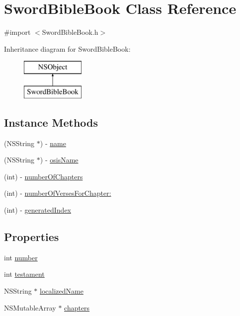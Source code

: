 \hypertarget{interface_sword_bible_book}{\section{Sword\-Bible\-Book Class Reference}
\label{interface_sword_bible_book}
}


{\ttfamily \#import $<$Sword\-Bible\-Book.\-h$>$}

Inheritance diagram for Sword\-Bible\-Book\-:\begin{figure}[H]
\begin{center}
\leavevmode
\includegraphics[height=2.000000cm]{interface_sword_bible_book}
\end{center}
\end{figure}
\subsection*{Instance Methods}
\begin{DoxyCompactItemize}
\item 
(N\-S\-String $\ast$) -\/ \hyperlink{interface_sword_bible_book_ac6691947ac2050dd45d083b4b998dada}{name}
\item 
(N\-S\-String $\ast$) -\/ \hyperlink{interface_sword_bible_book_a46996c5aaf602191a7a67dac407e023b}{osis\-Name}
\item 
(int) -\/ \hyperlink{interface_sword_bible_book_aac4a53d604f7b17a154e851538639254}{number\-Of\-Chapters}
\item 
(int) -\/ \hyperlink{interface_sword_bible_book_af8894ea2e0763646ed9d1cceee96a63f}{number\-Of\-Verses\-For\-Chapter\-:}
\item 
(int) -\/ \hyperlink{interface_sword_bible_book_a5228b654c226be16fbfd724c44f0c670}{generated\-Index}
\end{DoxyCompactItemize}
\subsection*{Properties}
\begin{DoxyCompactItemize}
\item 
int \hyperlink{interface_sword_bible_book_a7106e2abc437ad981830d14176d15f09}{number}
\item 
int \hyperlink{interface_sword_bible_book_a8911c7e1f406ce42f9095d385e8282b0}{testament}
\item 
N\-S\-String $\ast$ \hyperlink{interface_sword_bible_book_ac5da84b7de37f4b3d2f64daef232d343}{localized\-Name}
\item 
N\-S\-Mutable\-Array $\ast$ \hyperlink{interface_sword_bible_book_a6212acdba17c9a63959e760e75e7dddb}{chapters}
\end{DoxyCompactItemize}


